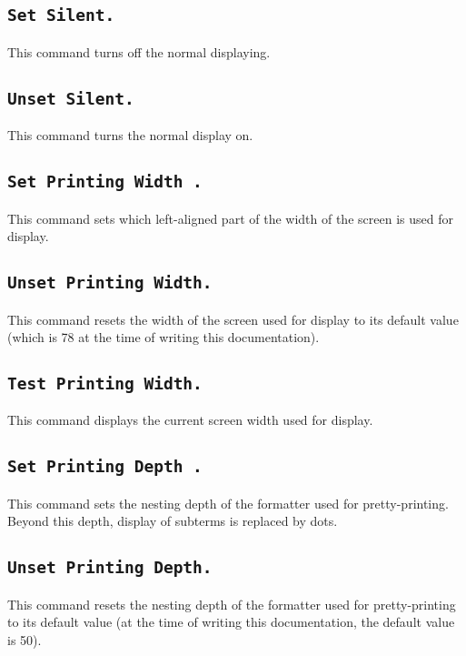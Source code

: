 \subsection[\tt Set Silent.]{\tt Set Silent.
\label{Begin-Silent}
}
This command turns off the normal displaying.

\subsection[\tt Unset Silent.]{\tt Unset Silent.}
This command turns the normal display on.

\subsection[\tt Set Printing Width {\integer}.]{\tt Set Printing Width {\integer}.}
\label{SetPrintingWidth}
This command sets which left-aligned part of the width of the screen
is used for display. 

\subsection[\tt Unset Printing Width.]{\tt Unset Printing Width.}
This command resets the width of the screen used for display to its
default value (which is 78 at the time of writing this documentation).

\subsection[\tt Test Printing Width.]{\tt Test Printing Width.}
This command displays the current screen width used for display.

\subsection[\tt Set Printing Depth {\integer}.]{\tt Set Printing Depth {\integer}.}
This command sets the nesting depth of the formatter used for
pretty-printing. Beyond this depth, display of subterms is replaced by
dots. 

\subsection[\tt Unset Printing Depth.]{\tt Unset Printing Depth.}
This command resets the nesting depth of the formatter used for
pretty-printing to its default value (at the
time of writing this documentation, the default value is 50).

